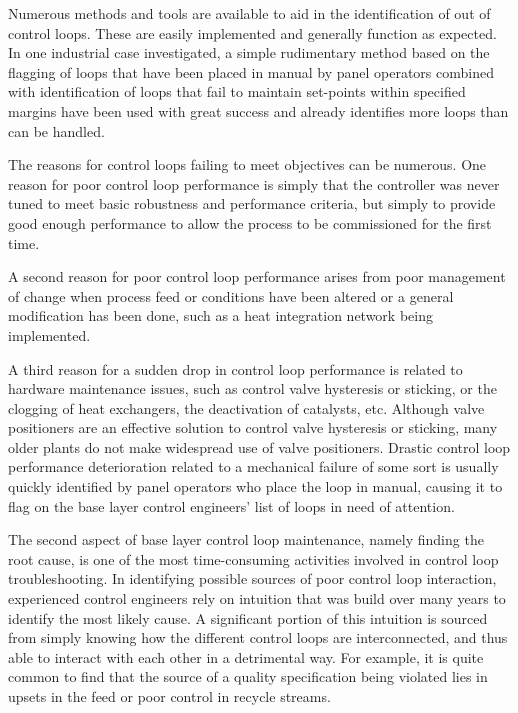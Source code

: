 \documentclass{article}
\begin{document}
Numerous methods and tools are available to aid in the identification of out of control loops.
These are easily implemented and generally function as expected.
In one industrial case investigated, a simple rudimentary method based on the flagging of loops that have been placed in manual by panel operators combined with identification of loops that fail to maintain set-points within specified margins have been used with great success and already identifies more loops than can be handled.

The reasons for control loops failing to meet objectives can be numerous.
One reason for poor control loop performance is simply that the controller was never tuned to meet basic robustness and performance criteria, but simply to provide good enough performance to allow the process to be commissioned for the first time.

A second reason for poor control loop performance arises from poor management of change when process feed or conditions have been altered or a general modification has been done, such as a heat integration network being implemented.

A third reason for a sudden drop in control loop performance is related to hardware maintenance issues, such as control valve hysteresis or sticking, or the clogging of heat exchangers, the deactivation of catalysts, etc.
Although valve positioners are an effective solution to control valve hysteresis or sticking, many older plants do not make widespread use of valve positioners.
Drastic control loop performance deterioration related to a mechanical failure of some sort is usually quickly identified by panel operators who place the loop in manual, causing it to flag on the base layer control engineers' list of loops in need of attention.

The second aspect of base layer control loop maintenance, namely finding the root cause, is one of the most time-consuming activities involved in control loop troubleshooting.
In identifying possible sources of poor control loop interaction, experienced control engineers rely on intuition that was build over many years to identify the most likely cause.
A significant portion of this intuition is sourced from simply knowing how the different control loops are interconnected, and thus able to interact with each other in a detrimental way.
For example, it is quite common to find that the source of a quality specification being violated lies in upsets in the feed or poor control in recycle streams.
\end{document}
